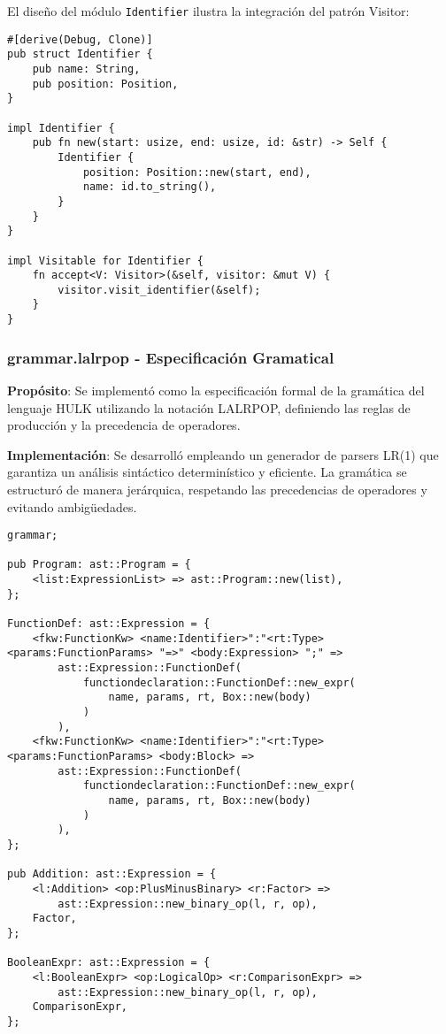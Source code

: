 \documentclass[12pt,a4paper]{article}
\begin{document}
El diseño del módulo \texttt{Identifier} ilustra la integración del patrón Visitor:

\begin{lstlisting}[style=rustcode,caption=Integración del patrón Visitor en tokens]
#[derive(Debug, Clone)]
pub struct Identifier {
    pub name: String,
    pub position: Position,
}

impl Identifier {
    pub fn new(start: usize, end: usize, id: &str) -> Self {
        Identifier {
            position: Position::new(start, end),
            name: id.to_string(),
        }
    }
}

impl Visitable for Identifier {
    fn accept<V: Visitor>(&self, visitor: &mut V) {
        visitor.visit_identifier(&self);
    }
}
\end{lstlisting}

\subsubsection{grammar.lalrpop - Especificación Gramatical}

\textbf{Propósito}: Se implementó como la especificación formal de la gramática del lenguaje HULK utilizando la notación LALRPOP, definiendo las reglas de producción y la precedencia de operadores.

\textbf{Implementación}: Se desarrolló empleando un generador de parsers LR(1) que garantiza un análisis sintáctico determinístico y eficiente. La gramática se estructuró de manera jerárquica, respetando las precedencias de operadores y evitando ambigüedades.

\begin{lstlisting}[style=lalrpop,caption=Reglas gramaticales principales]
grammar;

pub Program: ast::Program = {
    <list:ExpressionList> => ast::Program::new(list),
};

FunctionDef: ast::Expression = {
    <fkw:FunctionKw> <name:Identifier>":"<rt:Type><params:FunctionParams> "=>" <body:Expression> ";" =>
        ast::Expression::FunctionDef(
            functiondeclaration::FunctionDef::new_expr(
                name, params, rt, Box::new(body)
            )
        ),
    <fkw:FunctionKw> <name:Identifier>":"<rt:Type> <params:FunctionParams> <body:Block> =>
        ast::Expression::FunctionDef(
            functiondeclaration::FunctionDef::new_expr(
                name, params, rt, Box::new(body)
            )
        ),
};

pub Addition: ast::Expression = {
    <l:Addition> <op:PlusMinusBinary> <r:Factor> => 
        ast::Expression::new_binary_op(l, r, op),
    Factor,
};

BooleanExpr: ast::Expression = {
    <l:BooleanExpr> <op:LogicalOp> <r:ComparisonExpr> => 
        ast::Expression::new_binary_op(l, r, op),
    ComparisonExpr,
};
\end{lstlisting}
\end{document}

